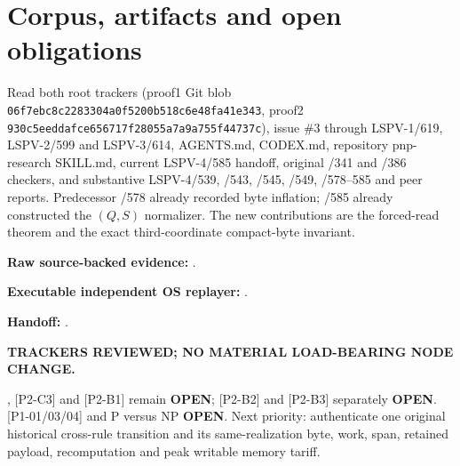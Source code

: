 \documentclass[11pt]{article}
\begin{document}
\section*{Corpus, artifacts and open obligations}
Read both root trackers (proof1 Git blob \texttt{06f7ebc8c2283304a0f5200b518c6e48fa41e343}, proof2 \texttt{930c5eeddafce656717f28055a7a9a755f44737c}), issue \#3 through LSPV-1/619, LSPV-2/599 and LSPV-3/614, AGENTS.md, CODEX.md, repository pnp-research SKILL.md, current LSPV-4/585 handoff, original /341 and /386 checkers, and substantive LSPV-4/539, /543, /545, /549, /578--585 and peer reports. Predecessor /578 already recorded byte inflation; /585 already constructed the $(Q,S)$ normalizer. The new contributions are the forced-read theorem and the exact third-coordinate compact-byte invariant.
\par\noindent \textbf{Raw source-backed evidence:} .
\par\noindent \textbf{Executable independent OS replayer:} .
\par\noindent \textbf{Handoff:} .
\par\noindent \textbf{TRACKERS REVIEWED; NO MATERIAL LOAD-BEARING NODE CHANGE.}
\par\noindent [P2-D1], [P2-C3] and [P2-B1] remain \textbf{OPEN}; [P2-B2] and [P2-B3] separately \textbf{OPEN}. [P1-01/03/04] and P versus NP \textbf{OPEN}. Next priority: authenticate one original historical cross-rule transition and its same-realization byte, work, span, retained payload, recomputation and peak writable memory tariff.
\end{document}
